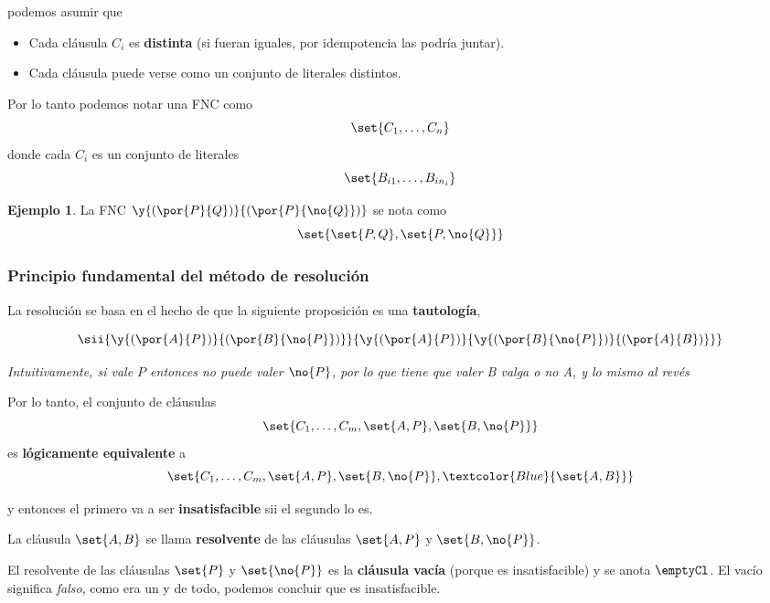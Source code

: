 \documentclass{report}
\theoremstyle{definition} %
\newtheorem*{example*}{Ejemplo}
\newcommand{\select}[1]{\textcolor{Blue}{#1}}
\begin{document}
podemos asumir que 

\begin{itemize}
    \item Cada cláusula $C_i$ es \textbf{distinta} (si fueran iguales, por
    idempotencia las podría juntar).
    \item Cada cláusula puede verse como un conjunto de literales distintos.
\end{itemize}

Por lo tanto podemos notar una FNC como
\[
    \set{C_1, \dots, C_n}
\]
donde cada $C_i$ es un conjunto de literales
\[
    \set{B_{i1}, \dots, B_{in_i}}
\]

\begin{example*}
    La FNC $\y{(\por{P}{Q})}{(\por{P}{\no{Q}})}$ se nota como
    \[
        \set{
            \set{P, Q},
            \set{P, \no{Q}}
        }
    \]
\end{example*}

\subsubsection{Principio fundamental del método de resolución}\label{sec:logico-lpo-resol-ppio-fundamental}

La resolución se basa en el hecho de que la siguiente proposición es una
\textbf{tautología},

\[
    \sii
    {
        \y{(\por{A}{P})}{(\por{B}{\no{P}})}
    }
    {
        \y
        {(\por{A}{P})}
        {
            \y
            {(\por{B}{\no{P}})}
            {(\por{A}{B})}
        }
    }
\]

\textit{Intuitivamente, si vale $P$ entonces no puede valer $\no{P}$, por lo que
tiene que valer B valga o no A, y lo mismo al revés}

Por lo tanto, el conjunto de cláusulas
\[
    \set{
        C_1, \dots, C_m,
        \set{A, P},
        \set{B, \no{P}}
    }
\]
es \textbf{lógicamente equivalente} a
\[
    \set{
        C_1, \dots, C_m,
        \set{A, P},
        \set{B, \no{P}},
        \select{\set{A, B}}
    }
\]

y entonces el primero va a ser \textbf{insatisfacible} sii el segundo lo es.

La cláusula $\set{A, B}$ se llama \textbf{resolvente} de las cláusulas $\set{A,
P}$ y $\set{B, \no{P}}$.

El resolvente de las cláusulas $\set{P}$ y $\set{\no{P}}$ es la \textbf{cláusula
vacía} (porque es insatisfacible) y se anota $\emptyCl$. El vacío significa
\textit{falso}, como era un y de todo, podemos concluir que es insatisfacible.
\end{document}
